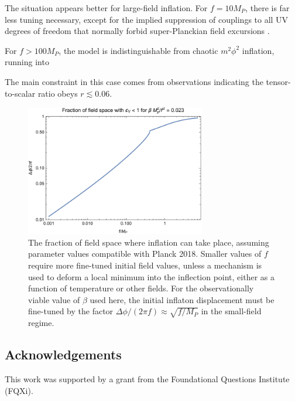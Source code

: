 \documentclass[aps,amsfonts,amsmath,prd,preprint,nofootinbib,superscriptaddress]{revtex4}
\newcommand{\Mp}{{M_{P}}}
\begin{document}
The situation appears better for large-field inflation.
For $f = 10 \Mp$, there is far less tuning necessary, except for the implied suppression of couplings to all UV degrees of freedom that normally forbid super-Planckian field excursions \cite{swampland, monodromy}.

For $f > 100 \Mp$, the model is indistinguishable from chaotic $m^2\phi^2$ inflation, running into  

The main constraint in this case comes from observations indicating the tensor-to-scalar ratio obeys $r \lesssim 0.06$.

\begin{figure}[!h]
  \centering
    \includegraphics[width=0.7\textwidth]{figures/SRfraction.pdf}
    \caption{The fraction of field space where inflation can take place, assuming parameter values compatible with Planck 2018.  Smaller values of $f$ require more fine-tuned initial field values, unless a 
    mechanism is used to deform a local minimum into the inflection point, either
    as a function of temperature or other fields.  For the observationally viable value of $\beta$ used here, the initial inflaton displacement must be fine-tuned by the factor $\Delta\phi/(2\pi f) \approx \sqrt{f/\Mp}$ in the small-field regime.}
\end{figure}











\subsection*{Acknowledgements}
This work was supported by a grant from the Foundational Questions Institute (FQXi).
\end{document}
